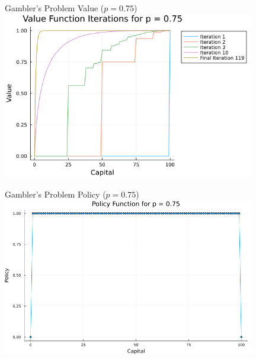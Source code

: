 \documentclass{beamer}
\begin{document}
\begin{frame}{Gambler's Problem Value ($p = 0.75$)}
	\includegraphics[width=11cm]{gamblers_problem_value_p075.png}
\end{frame}
\begin{frame}{Gambler's Problem Policy ($p = 0.75$)}
	\includegraphics[width=11cm]{gamblers_problem_policy_p075.png}
\end{frame}
\end{document}
